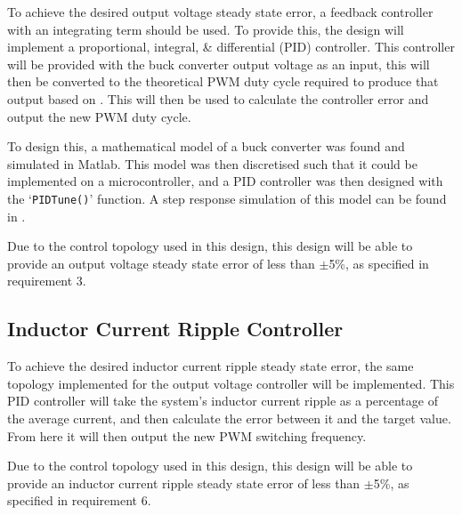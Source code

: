 To achieve the desired output voltage steady state error, a feedback controller with an integrating term should be used. To provide this, the design will implement a proportional, integral, \& differential (PID) controller. This controller will be provided with the buck converter output voltage as an input, this will then be converted to the theoretical PWM duty cycle required to produce that output based on . This will then be used to calculate the controller error and output the new PWM duty cycle.

To design this, a mathematical model of a buck converter \cite{Patil2015} was found and simulated in Matlab. This model was then discretised such that it could be implemented on a microcontroller, and a PID controller was then designed with the `\lstinline{PIDTune()}' function. A step response simulation of this model can be found in . 

Due to the control topology used in this design, this design will be able to provide an output voltage steady state error of less than $\pm$5\%, as specified in requirement 3.

\subsection{Inductor Current Ripple Controller}\label{S:ripple_control_design}

To achieve the desired inductor current ripple steady state error, the same topology implemented for the output voltage controller will be implemented. This PID controller will take the system's inductor current ripple as a percentage of the average current, and then calculate the error between it and the target value. From here it will then output the new PWM switching frequency. 

Due to the control topology used in this design, this design will be able to provide an inductor current ripple steady state error of less than $\pm$5\%, as specified in requirement 6.




